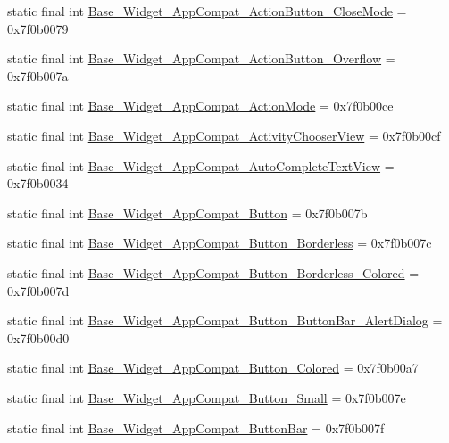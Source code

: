 \begin{CompactItemize}
static final int \hyperlink{classandroid_1_1support_1_1v4_1_1_r_1_1style_200755736a704d5d8f23691c7a92f201}{Base\_\-Widget\_\-AppCompat\_\-ActionButton\_\-CloseMode} = 0x7f0b0079
\item 
static final int \hyperlink{classandroid_1_1support_1_1v4_1_1_r_1_1style_00e479821186c06f736f66a55365ce32}{Base\_\-Widget\_\-AppCompat\_\-ActionButton\_\-Overflow} = 0x7f0b007a
\item 
static final int \hyperlink{classandroid_1_1support_1_1v4_1_1_r_1_1style_18945e005c007f0fb6e65807725619c1}{Base\_\-Widget\_\-AppCompat\_\-ActionMode} = 0x7f0b00ce
\item 
static final int \hyperlink{classandroid_1_1support_1_1v4_1_1_r_1_1style_d26455480a95599a3102df5c75ed79c2}{Base\_\-Widget\_\-AppCompat\_\-ActivityChooserView} = 0x7f0b00cf
\item 
static final int \hyperlink{classandroid_1_1support_1_1v4_1_1_r_1_1style_573510caac13e266b0f78539e1168989}{Base\_\-Widget\_\-AppCompat\_\-AutoCompleteTextView} = 0x7f0b0034
\item 
static final int \hyperlink{classandroid_1_1support_1_1v4_1_1_r_1_1style_7d97786c0db7296bc26c4924d21a2f22}{Base\_\-Widget\_\-AppCompat\_\-Button} = 0x7f0b007b
\item 
static final int \hyperlink{classandroid_1_1support_1_1v4_1_1_r_1_1style_333f58593436126b70bbb0ab29f4e651}{Base\_\-Widget\_\-AppCompat\_\-Button\_\-Borderless} = 0x7f0b007c
\item 
static final int \hyperlink{classandroid_1_1support_1_1v4_1_1_r_1_1style_93408f3ffe016f18d89da71227736a5a}{Base\_\-Widget\_\-AppCompat\_\-Button\_\-Borderless\_\-Colored} = 0x7f0b007d
\item 
static final int \hyperlink{classandroid_1_1support_1_1v4_1_1_r_1_1style_8079b4ee08cc00719e26a8834712e1fa}{Base\_\-Widget\_\-AppCompat\_\-Button\_\-ButtonBar\_\-AlertDialog} = 0x7f0b00d0
\item 
static final int \hyperlink{classandroid_1_1support_1_1v4_1_1_r_1_1style_db4b5bd6f4e954108af4af7ad1a54dfd}{Base\_\-Widget\_\-AppCompat\_\-Button\_\-Colored} = 0x7f0b00a7
\item 
static final int \hyperlink{classandroid_1_1support_1_1v4_1_1_r_1_1style_31dde7fb5ad5515c11b525740960d727}{Base\_\-Widget\_\-AppCompat\_\-Button\_\-Small} = 0x7f0b007e
\item 
static final int \hyperlink{classandroid_1_1support_1_1v4_1_1_r_1_1style_d06a0576cb697bab34bfd830e2a3a18a}{Base\_\-Widget\_\-AppCompat\_\-ButtonBar} = 0x7f0b007f
\item 

\end{CompactItemize}
